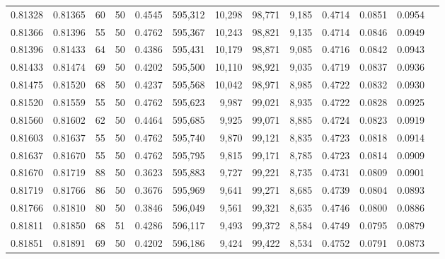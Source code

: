 \begin{tabular}{rrrrrrrrrrrrr}
0.81328 & 0.81365 &    60 &  50 &                                     0.4545 & 595,312 &  10,298 &  98,771 &   9,185 & 0.4714 & 0.0851 & 0.0954 \\
0.81366 & 0.81396 &    55 &  50 &                                     0.4762 & 595,367 &  10,243 &  98,821 &   9,135 & 0.4714 & 0.0846 & 0.0949 \\
0.81396 & 0.81433 &    64 &  50 &                                     0.4386 & 595,431 &  10,179 &  98,871 &   9,085 & 0.4716 & 0.0842 & 0.0943 \\
0.81433 & 0.81474 &    69 &  50 &                                     0.4202 & 595,500 &  10,110 &  98,921 &   9,035 & 0.4719 & 0.0837 & 0.0936 \\
0.81475 & 0.81520 &    68 &  50 &                                     0.4237 & 595,568 &  10,042 &  98,971 &   8,985 & 0.4722 & 0.0832 & 0.0930 \\
0.81520 & 0.81559 &    55 &  50 &                                     0.4762 & 595,623 &   9,987 &  99,021 &   8,935 & 0.4722 & 0.0828 & 0.0925 \\
0.81560 & 0.81602 &    62 &  50 &                                     0.4464 & 595,685 &   9,925 &  99,071 &   8,885 & 0.4724 & 0.0823 & 0.0919 \\
0.81603 & 0.81637 &    55 &  50 &                                     0.4762 & 595,740 &   9,870 &  99,121 &   8,835 & 0.4723 & 0.0818 & 0.0914 \\
0.81637 & 0.81670 &    55 &  50 &                                     0.4762 & 595,795 &   9,815 &  99,171 &   8,785 & 0.4723 & 0.0814 & 0.0909 \\
0.81670 & 0.81719 &    88 &  50 &                                     0.3623 & 595,883 &   9,727 &  99,221 &   8,735 & 0.4731 & 0.0809 & 0.0901 \\
0.81719 & 0.81766 &    86 &  50 &                                     0.3676 & 595,969 &   9,641 &  99,271 &   8,685 & 0.4739 & 0.0804 & 0.0893 \\
0.81766 & 0.81810 &    80 &  50 &                                     0.3846 & 596,049 &   9,561 &  99,321 &   8,635 & 0.4746 & 0.0800 & 0.0886 \\
0.81811 & 0.81850 &    68 &  51 &                                     0.4286 & 596,117 &   9,493 &  99,372 &   8,584 & 0.4749 & 0.0795 & 0.0879 \\
0.81851 & 0.81891 &    69 &  50 &                                     0.4202 & 596,186 &   9,424 &  99,422 &   8,534 & 0.4752 & 0.0791 & 0.0873 \\

\end{tabular}
